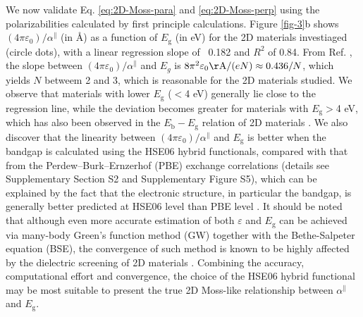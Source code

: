 \documentclass[journal=ancac3,manuscript=article,email=true,hyperref=true,keywords=false]{achemso}
\begin{document}
We now validate Eq. \ref{eq:2D-Moss-para} and \ref{eq:2D-Moss-perp}
using the polarizabilities calculated by first principle
calculations. Figure \ref{fig-3}b shows
$(4 \pi \varepsilon_{0})/\alpha^{\parallel}$ (in \AA{}) as a function
of $E_{\mathrm{g}}$ (in eV) for the 2D materials investiaged (circle dots), with a
linear regression slope of ~0.182 and $R^{2}$ of 0.84. From
Ref. \cite{Jiang_2017_Eg_Eb}, the slope between
$(4 \pi \varepsilon_{0})/\alpha^{\parallel}$ and $E_{g}$ is
$8\pi^{2}\varepsilon_{0} \mathrm{\AA}/(eN) \approx 0.436/N$, which
yields $N$ betweem 2 and 3, which is reasonable for the 2D materials
studied. We observe that materials with lower $E_{\mathrm{g}}$ ($<$4
eV) generally lie close to the regression line, while the deviation
becomes greater for materials with $E_{\mathrm{g}}>$4 eV, which has
also been observed in the $E_{\mathrm{b}}-E_{\mathrm{g}}$ relation of
2D materials \cite{Olsen_2016_hydrogen,Jiang_2017_Eg_Eb}. We also
discover that the linearity between
$(4 \pi \varepsilon_{0})/\alpha^{\parallel}$ and $E_{\mathrm{g}}$ is
better when the bandgap is calculated using the HSE06 hybrid
functionals, compared with that from the Perdew--Burk--Ernzerhof (PBE)
exchange correlations (details see Supplementary Section S2 and
Supplementary Figure S5), which can be explained by the fact that the
electronic structure, in particular the bandgap, is generally better
predicted at HSE06 level than PBE level \cite{Heyd_2005}. It should be
noted that although even more accurate estimation of both
$\varepsilon$ and $E_{\mathrm{g}}$ can be achieved via many-body
Green’s function method (GW) together with the Bethe-Salpeter
equation (BSE), the convergence of such method is known to be highly
affected by the dielectric screening of 2D materials
\cite{Hueser_2013_2Dvs3D}. Combining the accuracy, computational
effort and convergence, the choice of the HSE06 hybrid functional may
be most suitable to present the true 2D Moss-like relationship between
$\alpha^{\parallel}$ and $E_{\mathrm{g}}$.
\end{document}
